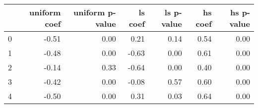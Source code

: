 \begin{tabular}{lrrrrrr}
\toprule
 & uniform coef & uniform p-value & ls coef & ls p-value & hs coef & hs p-value \\
\midrule
0 & -0.51 & 0.00 & 0.21 & 0.14 & 0.54 & 0.00 \\
1 & -0.48 & 0.00 & -0.63 & 0.00 & 0.61 & 0.00 \\
2 & -0.14 & 0.33 & -0.64 & 0.00 & 0.40 & 0.00 \\
3 & -0.42 & 0.00 & -0.08 & 0.57 & 0.60 & 0.00 \\
4 & -0.50 & 0.00 & 0.31 & 0.03 & 0.64 & 0.00 \\
\bottomrule
\end{tabular}
